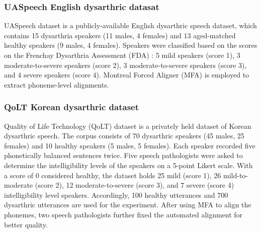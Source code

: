 \subsubsection{UASpeech English dysarthric datasat} \label{sssec:uaspeech}
UASpeech dataset \cite{kim2008uaspeech} is a publicly-available English dysarthric speech dataset, which contains 15 dysarthria speakers (11 males, 4 females) and 13 aged-matched healthy speakers (9 males, 4 females). 
Speakers were classified based on the scores on the Frenchay Dysarthria Assessment (FDA) \cite{enderby1980frenchay}: 5 mild speakers (score 1), 3 moderate-to-severe speakers (score 2), 3 moderate-to-severe speakers (score 3), and 4 severe speakers (score 4). 
Montreal Forced Aligner (MFA) \cite{mcauliffe2017montreal} is employed to extract phoneme-level alignments.



\subsubsection{QoLT Korean dysarthric dataset} \label{sssec:qolt}
Quality of Life Technology (QoLT) dataset \cite{choi2012dysarthric} is a privately held dataset of Korean dysarthric speech. 
The corpus consists of 70 dysarthric speakers (45 males, 25 females) and 10 healthy speakers (5 males, 5 females).
Each speaker recorded five phonetically balanced sentences twice. 
Five speech pathologists were asked to determine the intelligibility levels of the speakers on a 5-point Likert scale.
With a score of 0 considered healthy, the dataset holds 25 mild (score 1), 26 mild-to-moderate (score 2), 12 moderate-to-severe (score 3), and 7 severe (score 4) intelligibility level speakers.
Accordingly, 100 healthy utterances and 700 dysarthric utterances are used for the experiment.
After using MFA to align the phonemes, two speech pathologists further fixed the automated alignment for better quality.

